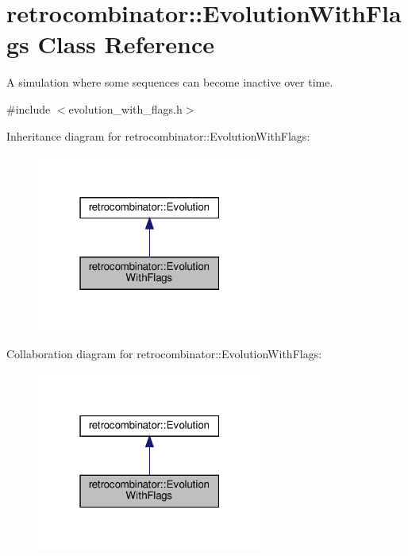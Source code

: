 \hypertarget{classretrocombinator_1_1EvolutionWithFlags}{}\section{retrocombinator\+:\+:Evolution\+With\+Flags Class Reference}
\label{classretrocombinator_1_1EvolutionWithFlags}


A simulation where some sequences can become inactive over time.  




{\ttfamily \#include $<$evolution\+\_\+with\+\_\+flags.\+h$>$}



Inheritance diagram for retrocombinator\+:\+:Evolution\+With\+Flags\+:\nopagebreak
\begin{figure}[H]
\begin{center}
\leavevmode
\includegraphics[width=211pt]{classretrocombinator_1_1EvolutionWithFlags__inherit__graph}
\end{center}
\end{figure}


Collaboration diagram for retrocombinator\+:\+:Evolution\+With\+Flags\+:\nopagebreak
\begin{figure}[H]
\begin{center}
\leavevmode
\includegraphics[width=211pt]{classretrocombinator_1_1EvolutionWithFlags__coll__graph}
\end{center}
\end{figure}
